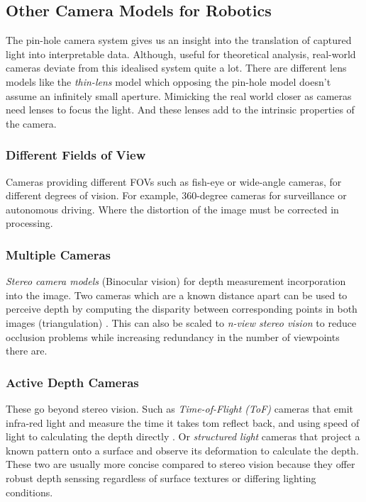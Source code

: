 \subsection{Other Camera Models for Robotics}
The pin-hole camera system gives us an insight into the translation of captured light into interpretable data. Although, useful for theoretical analysis, real-world cameras deviate from this idealised system quite a lot.
There are different lens models like the \emph{thin-lens} model which opposing the pin-hole model doesn't assume an infinitely small aperture. Mimicking the real world closer as cameras need lenses to focus the light. And these lenses add to the intrinsic properties of the camera.
\subsubsection{Different Fields of View}
Cameras providing different FOVs such as fish-eye or wide-angle cameras, for different degrees of vision. For example, 360-degree cameras for surveillance or autonomous driving. Where the distortion of the image must be corrected in processing.
\subsubsection{Multiple Cameras}
\emph{Stereo camera models} (Binocular vision) for depth measurement incorporation into the image. Two cameras which are a known distance apart can be used to perceive depth by computing the disparity between corresponding points in both images (triangulation) \cite{hamzah2016literature}. This can also be scaled to \emph{n-view stereo vision} to reduce occlusion problems while increasing redundancy in the number of viewpoints there are.
\label{subsubsec:nview}

\subsubsection{Active Depth Cameras}
These go beyond stereo vision. Such as \emph{Time-of-Flight (ToF)} cameras that emit infra-red light and measure the time it takes tom reflect back, and using speed of light to calculating the depth directly \cite{foix2011tof,zanuttigh2016time}. Or \emph{structured light} cameras that project a known pattern onto a surface and observe its deformation to calculate the depth. These two are usually more concise compared to stereo vision because they offer robust depth senssing regardless of surface textures or differing lighting conditions.

